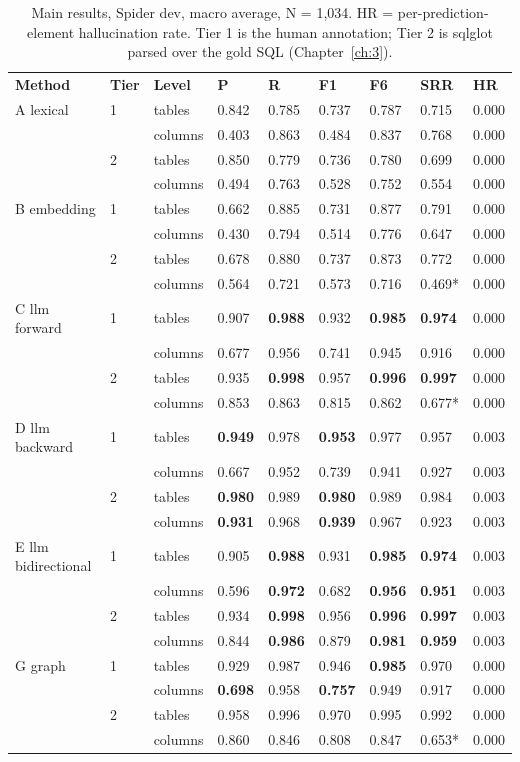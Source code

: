 \begin{table}[htbp]
\centering
\caption{Main results, Spider dev, macro average, N = 1,034. HR = per-prediction-element hallucination rate. Tier 1 is the \citet{taniguchi2021} human annotation; Tier 2 is sqlglot parsed over the gold SQL (Chapter~\ref{ch:3}).}\label{tab:5-1}
\footnotesize\setlength{\tabcolsep}{4pt}
\begin{tabular}{@{}lllllllll@{}}
\toprule
\textbf{Method} & \textbf{Tier} & \textbf{Level} & \textbf{P} & \textbf{R} & \textbf{F1} & \textbf{F6} & \textbf{SRR} & \textbf{HR}\tabularnewline
A lexical & 1 & tables & 0.842 & 0.785 & 0.737 & 0.787 & 0.715 & 0.000\tabularnewline
& & columns & 0.403 & 0.863 & 0.484 & 0.837 & 0.768 & 0.000\tabularnewline
& 2 & tables & 0.850 & 0.779 & 0.736 & 0.780 & 0.699 & 0.000\tabularnewline
& & columns & 0.494 & 0.763 & 0.528 & 0.752 & 0.554 & 0.000\tabularnewline
B embedding & 1 & tables & 0.662 & 0.885 & 0.731 & 0.877 & 0.791 & 0.000\tabularnewline
& & columns & 0.430 & 0.794 & 0.514 & 0.776 & 0.647 & 0.000\tabularnewline
& 2 & tables & 0.678 & 0.880 & 0.737 & 0.873 & 0.772 & 0.000\tabularnewline
& & columns & 0.564 & 0.721 & 0.573 & 0.716 & 0.469* & 0.000\tabularnewline
C llm forward & 1 & tables & 0.907 & \textbf{0.988} & 0.932 & \textbf{0.985} & \textbf{0.974} & 0.000\tabularnewline
& & columns & 0.677 & 0.956 & 0.741 & 0.945 & 0.916 & 0.000\tabularnewline
& 2 & tables & 0.935 & \textbf{0.998} & 0.957 & \textbf{0.996} & \textbf{0.997} & 0.000\tabularnewline
& & columns & 0.853 & 0.863 & 0.815 & 0.862 & 0.677* & 0.000\tabularnewline
D llm backward & 1 & tables & \textbf{0.949} & 0.978 & \textbf{0.953} & 0.977 & 0.957 & 0.003\tabularnewline
& & columns & 0.667 & 0.952 & 0.739 & 0.941 & 0.927 & 0.003\tabularnewline
& 2 & tables & \textbf{0.980} & 0.989 & \textbf{0.980} & 0.989 & 0.984 & 0.003\tabularnewline
& & columns & \textbf{0.931} & 0.968 & \textbf{0.939} & 0.967 & 0.923 & 0.003\tabularnewline
E llm bidirectional & 1 & tables & 0.905 & \textbf{0.988} & 0.931 & \textbf{0.985} & \textbf{0.974} & 0.003\tabularnewline
& & columns & 0.596 & \textbf{0.972} & 0.682 & \textbf{0.956} & \textbf{0.951} & 0.003\tabularnewline
& 2 & tables & 0.934 & \textbf{0.998} & 0.956 & \textbf{0.996} & \textbf{0.997} & 0.003\tabularnewline
& & columns & 0.844 & \textbf{0.986} & 0.879 & \textbf{0.981} & \textbf{0.959} & 0.003\tabularnewline
G graph & 1 & tables & 0.929 & 0.987 & 0.946 & \textbf{0.985} & 0.970 & 0.000\tabularnewline
& & columns & \textbf{0.698} & 0.958 & \textbf{0.757} & 0.949 & 0.917 & 0.000\tabularnewline
& 2 & tables & 0.958 & 0.996 & 0.970 & 0.995 & 0.992 & 0.000\tabularnewline
& & columns & 0.860 & 0.846 & 0.808 & 0.847 & 0.653* & 0.000\tabularnewline
\bottomrule
\end{tabular}
\end{table}






